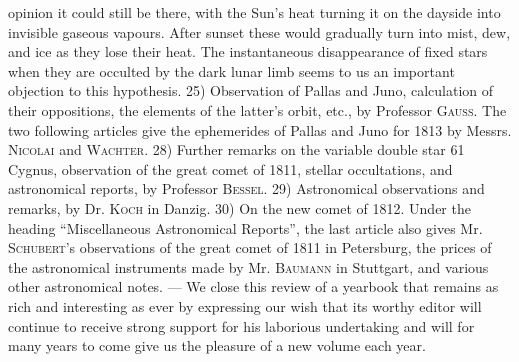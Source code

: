 opinion it could still be there, with the Sun's heat turning it on the dayside into invisible gaseous vapours. After sunset these would gradually turn into mist, dew, and ice as they lose their heat. The instantaneous disappearance of fixed stars when they are occulted by the dark lunar limb seems to us an important objection to this hypothesis. 25) Observation of Pallas and Juno, calculation of their oppositions, the elements of the latter's orbit, etc., by Professor \textsc{Gauss}. The two following articles give the ephemerides of Pallas and Juno for 1813 by Messrs. \textsc{Nicolai} and \textsc{Wachter}. 28) Further remarks on the variable double star 61 Cygnus, observation of the great comet of 1811, stellar occultations, and astronomical reports, by Professor \textsc{Bessel}. 29) Astronomical observations and remarks, by Dr. \textsc{Koch} in Danzig. 30) On the new comet of 1812. Under the heading “Miscellaneous Astronomical Reports”, the last article also gives Mr. \textsc{Schubert}'s observations of the great comet of 1811 in Petersburg, the prices of the astronomical instruments made by Mr. \textsc{Baumann} in Stuttgart, and various other astronomical notes. --- We close this review of a yearbook that remains as rich and interesting as ever by expressing our wish that its worthy editor will continue to receive strong support for his laborious undertaking and will for many years to come give us the pleasure of a new volume each year.
